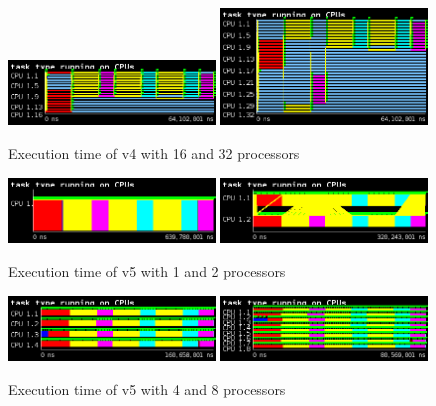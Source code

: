 \begin{figure}[H]%
    \label{fig:plot_v4_16}
    \centering
    \includegraphics[width=0.49\textwidth]{./data/3dfft_/plots/v4_16.png}
    \includegraphics[width=0.49\textwidth]{./data/3dfft_/plots/v4_32.png}
    \caption{Execution time of v4 with 16 and 32 processors}%
\end{figure}

\begin{figure}[H]%
    \centering
    \includegraphics[width=0.49\textwidth]{./data/3dfft_/plots/v5_01.png}
    \includegraphics[width=0.49\textwidth]{./data/3dfft_/plots/v5_02.png}
    \caption{Execution time of v5 with 1 and 2 processors}%
    \label{fig:plot_v5_01}
\end{figure}

\begin{figure}[H]%
    \label{fig:plot_v5_04}
    \centering
    \includegraphics[width=0.49\textwidth]{./data/3dfft_/plots/v5_04.png}
    \includegraphics[width=0.49\textwidth]{./data/3dfft_/plots/v5_08.png}
    \caption{Execution time of v5 with 4 and 8 processors}%
\end{figure}

